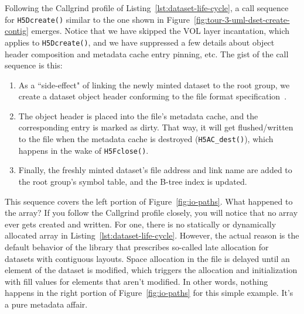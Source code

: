 Following the Callgrind profile of Listing~\ref{lst:dataset-life-cycle}, a call sequence for \texttt{H5Dcreate()} similar to the one shown in Figure~\ref{fig:tour-3-uml-dset-create-contig} emerges. Notice that we have skipped the VOL layer incantation, which applies to \texttt{H5Dcreate()}, and we have suppressed a few details about object header composition and metadata cache entry pinning, etc. The gist of the call sequence is this:

\begin{enumerate}
    \item As a ``side-effect" of linking the newly minted dataset to the root group, we create a dataset object header conforming to the file format specification~\cite{ffmt}.
    \item The object header is placed into the file's metadata cache, and the corresponding entry is marked as dirty. That way, it will get flushed/written to the file when the metadata cache is destroyed (\texttt{H5AC\_dest()}), which happens in the wake of \texttt{H5Fclose()}.
    \item Finally, the freshly minted dataset's file address and link name are added to the root group's symbol table, and the B-tree index is updated.
\end{enumerate}

This sequence covers the left portion of Figure~\ref{fig:io-paths}. What happened to the array? If you follow the Callgrind profile closely, you will notice that no array ever gets created and written. For one, there is no statically or dynamically allocated array in Listing~\ref{lst:dataset-life-cycle}. However, the actual reason is the default behavior of the library that prescribes so-called late allocation for datasets with contiguous layouts. Space allocation in the file is delayed until an element of the dataset is modified, which triggers the allocation and initialization with fill values for elements that aren't modified. In other words, nothing happens in the right portion of Figure~\ref{fig:io-paths} for this simple example. It's a pure metadata affair.

